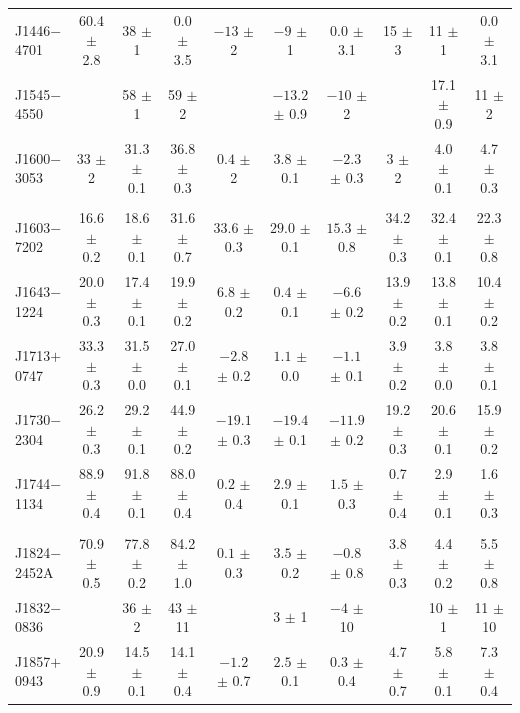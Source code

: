 \begin{landscape}
\begin{table}
\begin{center}
\begin{tabular}{lccccccccc}
J1446$-$4701& 60.4 $\pm$ 2.8& 38   $\pm $ 1  & 0.0  $\pm$ 3.5&$ -13 $ $\pm$ 2   &$ -9  $ $\pm$ 1   &$ 0.0 $ $\pm$ 3.1 &  15  $\pm$ 3   &   11 $\pm$ 1   & 0.0  $\pm$ 3.1 \\
J1545$-$4550&               & 58   $\pm $ 1  & 59   $\pm$ 2  &                  &$-13.2$ $\pm$ 0.9 &$ -10 $ $\pm$ 2   &                & 17.1 $\pm$ 0.9 & 11   $\pm$ 2 \\
J1600$-$3053& 33   $\pm$ 2  & 31.3 $\pm $ 0.1& 36.8 $\pm$ 0.3&$ 0.4 $ $\pm$ 2   &$  3.8$ $\pm$ 0.1 &$ -2.3$ $\pm$ 0.3 &    3 $\pm$ 2   &  4.0 $\pm$ 0.1 & 4.7  $\pm$ 0.3 \\
            &               &                &               &                  &                  &                  &                &                &       \\
J1603$-$7202& 16.6 $\pm$ 0.2& 18.6 $\pm $ 0.1& 31.6 $\pm$ 0.7&$33.6 $ $\pm$ 0.3 &$ 29.0$ $\pm$ 0.1 &$ 15.3$ $\pm$ 0.8 & 34.2 $\pm$ 0.3 & 32.4 $\pm$ 0.1 & 22.3 $\pm$ 0.8 \\
J1643$-$1224& 20.0 $\pm$ 0.3& 17.4 $\pm $ 0.1& 19.9 $\pm$ 0.2&$ 6.8 $ $\pm$ 0.2 &$  0.4$ $\pm$ 0.1 &$ -6.6$ $\pm$ 0.2 & 13.9 $\pm$ 0.2 & 13.8 $\pm$ 0.1 & 10.4 $\pm$ 0.2 \\
J1713$+$0747& 33.3 $\pm$ 0.3& 31.5 $\pm $ 0.0& 27.0 $\pm$ 0.1&$-2.8 $ $\pm$ 0.2 &$  1.1$ $\pm$ 0.0 &$ -1.1$ $\pm$ 0.1 &  3.9 $\pm$ 0.2 &  3.8 $\pm$ 0.0 & 3.8  $\pm$ 0.1 \\
J1730$-$2304& 26.2 $\pm$ 0.3& 29.2 $\pm $ 0.1& 44.9 $\pm$ 0.2&$-19.1$ $\pm$ 0.3 &$-19.4$ $\pm$ 0.1 &$-11.9$ $\pm$ 0.2 & 19.2 $\pm$ 0.3 & 20.6 $\pm$ 0.1 & 15.9 $\pm$ 0.2 \\
J1744$-$1134& 88.9 $\pm$ 0.4& 91.8 $\pm $ 0.1& 88.0 $\pm$ 0.4&$ 0.2 $ $\pm$ 0.4 &$  2.9$ $\pm$ 0.1 &$  1.5$ $\pm$ 0.3 &  0.7 $\pm$ 0.4 &  2.9 $\pm$ 0.1 & 1.6  $\pm$ 0.3 \\
            &               &                &               &                  &                  &                  &                &                &               \\
J1824$-$2452A& 70.9 $\pm$ 0.5& 77.8 $\pm $ 0.2& 84.2 $\pm$ 1.0&$ 0.1 $ $\pm$ 0.3 &$  3.5$ $\pm$ 0.2 &$ -0.8$ $\pm$ 0.8 &  3.8 $\pm$ 0.3 &  4.4 $\pm$ 0.2 & 5.5  $\pm$ 0.8 \\
J1832$-$0836&               & 36   $\pm $ 2  & 43   $\pm$ 11 &                  &$   3 $ $\pm$ 1   &$   -4$ $\pm$ 10  &                &   10 $\pm$ 1   & 11   $\pm$ 10   \\
J1857$+$0943& 20.9 $\pm$ 0.9& 14.5 $\pm $ 0.1& 14.1 $\pm$ 0.4&$ -1.2$ $\pm$ 0.7 &$  2.5$ $\pm$ 0.1 &$  0.3$ $\pm$ 0.4 &  4.7 $\pm$ 0.7 &  5.8 $\pm$ 0.1 & 7.3  $\pm$ 0.4 \\

\end{tabular}
\end{center}
\end{table}
\end{landscape}
